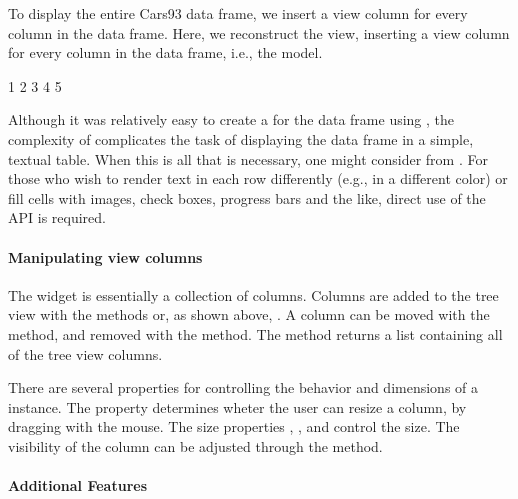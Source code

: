 To display the entire Cars93 data frame, we insert a view column for
every column in the data frame. Here, we reconstruct the view, inserting
a view column for every column in the data frame, i.e., the model.
\begin{Schunk}
\begin{Soutput}
[1] 1 2 3 4 5
\end{Soutput}
\end{Schunk}
%
Although it was relatively easy to create a  for
the data frame using , the complexity of
 complicates the task of displaying the data frame
in a simple, textual table. When this is all that is necessary, one
might consider  from . For those
who wish to render text in each row differently (e.g., in a different
color) or fill cells with images, check boxes, progress bars and the
like, direct use of the  API is required.

\paragraph{Manipulating view columns}

The  widget is essentially a collection of
columns. Columns are added to the tree view with the methods
 or, as shown above,
.  A column can be
moved with the  method, and
removed with the  method. The
 method returns a list containing all
of the tree view columns.

There are several properties for controlling the behavior and
dimensions of a  instance. The property
 determines wheter the user can resize a column, by
dragging with the mouse. The size properties ,
, and  control the size. The
visibility of the column can be adjusted through the
 method.

\paragraph{Additional Features}

